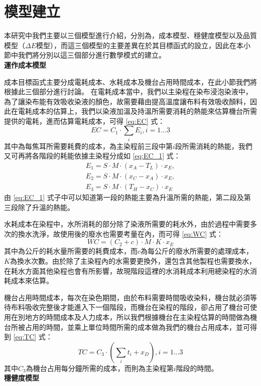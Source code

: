 \section{模型建立}
\label{c:ch4.3}
本研究中我們主要以三個模型進行介紹，分別為，成本模型、穩健度模型以及品質模型（$\Delta E$模型），而這三個模型的主要差異在於其目標函式的設立，因此在本小節中我們將分別以這三個部分進行數學模式的建立。
\\ \textbf{運作成本模型}

成本目標函式主要分成電耗成本、水耗成本及機台占用時間成本，在此小節我們將根據此三個部分進行討論。
在電耗成本當中，我們以主染程在染布浸泡染液中，為了讓染布能有效吸收染液的顏色，故需要藉由提高溫度讓布料有效吸收顏料，因此在電耗成本的估算上，我們以染液加溫及持溫所需要消耗的熱能來估算機台所需提供的電耗，進而估算電耗成本，可得 \ref{eq:EC} 式：
\begin{equation}
	EC=C_1 \cdot \sum_i E_i, i=1 \dots 3
\label{eq:EC}
\end{equation}
其中為每焦耳所需要耗費的成本，為主染程前三段中第$i$段所需消耗的熱能，我們又可再將各階段的耗能依據主染程分成如 \ref{eq:EC_1} 式：
\begin{equation}
	\begin{array}{c}
	E_1=S \cdot M \cdot (x_A-T_L) \cdot x_E,\\
	E_2=S \cdot M \cdot (x_C-x_A) \cdot x_E,\\
	E_3=S \cdot M \cdot (T_H-x_C) \cdot x_E
	\end{array}
\label{eq:EC_1}
\end{equation}
由 \ref{eq:EC_1} 式子中可以知道第一段的熱能主要為升溫所需的熱能，第二段及第三段除了升溫的熱能。

水耗成本在染程中，水所消耗的部分除了染液所需要的耗水外，由於過程中需要多次的換水洗淨，故使用後的廢水也需要考量在內，而可得 \ref{eq:WC} 式：
\begin{equation}
	WC=(C_2+c) \cdot M \cdot K \cdot x_E
\label{eq:WC}
\end{equation}
其中為公斤的耗水量所需要的耗費成本，而$c$為每公斤的廢水所需要的處理成本，$K$為換水次數。由於除了主染程內的水需要更換外，還包含其他製程也需要換水，在耗水方面其他染程也會有所影響，故現階段這裡的水消耗成本利用總染程的水消耗成本來估算。

機台占用時間成本，每次在染色期間，由於布料需要時間吸收染料，機台就必須等待布料吸收完整後才能進入下一個階段，而機台在染程的階段，卻占用了機台可使用在別地方的時間成本及人力成本，所以我們根據機台在主染程估算的時間做為機台所被占用的時間，並乘上單位時間所需的成本做為我們的機台占用成本，並可得到 \ref{eq:TC} 式：
\begin{equation}
	TC=C_3 \cdot (\sum_i t_i + x_D), i=1\dots 3
\label{eq:TC}
\end{equation}
其中$C_3$為機台占用每分鐘所需的成本，而則為主染程第$i$階段的時間。
\\ \textbf{穩健度模型}

